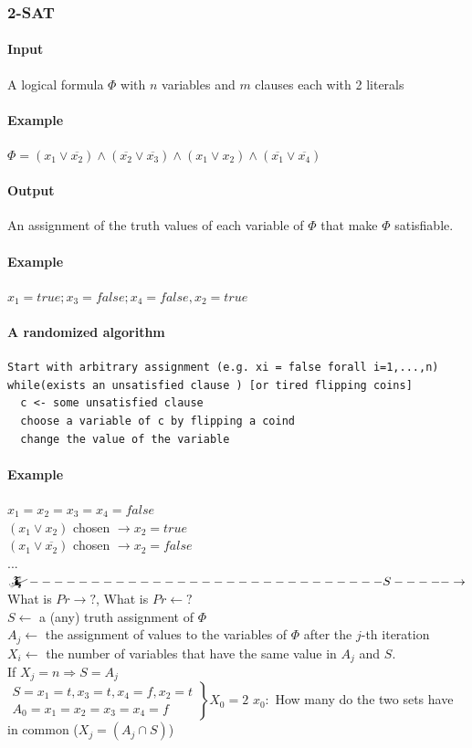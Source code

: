 \subsubsection{2-SAT}
\paragraph{Input} A logical formula $\Phi$ with $n$ variables and $m$ clauses each with 2 literals
\paragraph{Example} $\Phi = (x_1 \lor \overline{x_2}) \land (\overline{x_2} \lor \overline{x_3}) \land (x_1 \lor x_2) \land (\overline{x_1} \lor \overline{x_4})$
\paragraph{Output} An assignment of the truth values of each variable of $\Phi$ that make $\Phi$ satisfiable.
\paragraph{Example} $x_1=true;x_3=false;x_4=false,x_2=true$
\paragraph{A randomized algorithm} 
\begin{verbatim}
Start with arbitrary assignment (e.g. xi = false forall i=1,...,n) 
while(exists an unsatisfied clause ) [or tired flipping coins]
  c <- some unsatisfied clause
  choose a variable of c by flipping a coind
  change the value of the variable
\end{verbatim}
\paragraph{Example} $x_1=x_2=x_3=x_4=false$ \\
$(x_1 \lor x_2)$ chosen $\rightarrow x_2=true$ \\
$(x_1 \lor \overline{x_2})$ chosen $\rightarrow x_2=false$ \\
... \\
$\mathwitch -----------------------------S-----\rightarrow$ \\
What is $Pr \rightarrow ?$, What is $Pr \leftarrow ?$ \\
$S \leftarrow$ a (any) truth assignment of $\Phi$ \\
$A_j \leftarrow$ the assignment of values to the variables of $\Phi$ after the $j$-th iteration \\
$X_i \leftarrow$ the number of variables that have the same value in $A_j$ and $S$. \\
If $X_j = n \Rightarrow S=A_j$ \\
$\left.\begin{aligned}
S = x_1 = t, x_3=t,x_4=f, x_2 = t \\
A_0=x_1=x_2=x_3=x_4=f
\end{aligned}\right\rbrace X_0=2$ 
$x_0:$ How many do the two sets have in common ($X_j=(A_j\cap S)$) 
